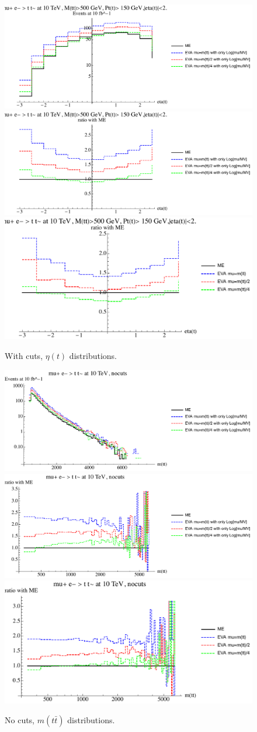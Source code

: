 \documentclass[a4paper,11pt]{article}
\begin{document}
\begin{figure}[!t]
\includegraphics[width=0.46\linewidth]{Notebooks/PlotDistr/WW_tt/10TeVcuts/plotetat.pdf}
\includegraphics[width=0.46\linewidth]{Notebooks/PlotDistr/WW_tt/10TeVcuts/plotetatratio1.pdf}
\includegraphics[width=0.46\linewidth]{Notebooks/PlotDistr/WW_tt/10TeVcuts/plotetatratio2.pdf}
\caption{With cuts, $\eta(t)$ distributions. \label{fig:cutsWWtt2}}
\end{figure}
 
 
 \begin{figure}[!t]
\includegraphics[width=0.46\linewidth]{Notebooks/PlotDistr/WW_tt/10TeVnocuts/plotmtt.pdf}
\includegraphics[width=0.46\linewidth]{Notebooks/PlotDistr/WW_tt/10TeVnocuts/plotmttratio1.pdf}
\includegraphics[width=0.46\linewidth]{Notebooks/PlotDistr/WW_tt/10TeVnocuts/plotmttratio2.pdf}
\caption{No cuts, $m(t \bar t)$ distributions. \label{fig:nocutsWWtt}}
\end{figure}
\end{document}
